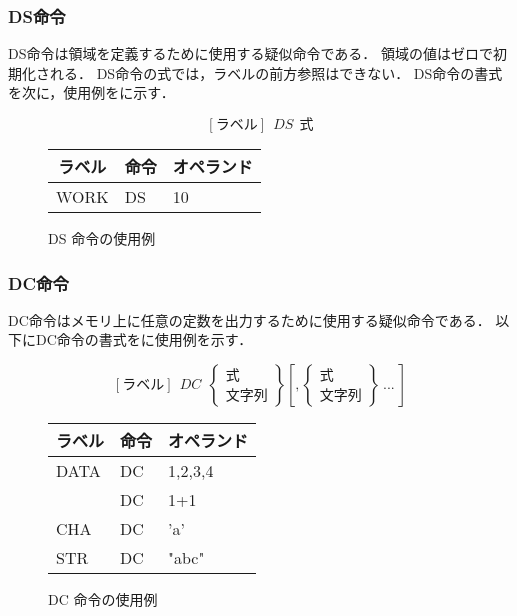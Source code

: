 \subsubsection{DS命令}
DS命令は領域を定義するために使用する疑似命令である．
領域の値はゼロで初期化される．
DS命令の式では，ラベルの前方参照はできない．
DS命令の書式を次に，使用例をに示す．

{\small\[ [ラベル]~~DS~~式 \]}

\begin{figure}[btp]
\begin{center}
{\tt\small\begin{tabular}{|l|l|l|}\hline
\multicolumn{1}{|c|}{ラベル} & 
        \multicolumn{1}{c|}{命令} & \multicolumn{1}{c|}{オペランド} \\\hline
WORK & DS & 10 \\\hline
\end{tabular}}
\caption{DS 命令の使用例}
\label{fig:appB:ds}
\end{center}
\end{figure}

\subsubsection{DC命令}
DC命令はメモリ上に任意の定数を出力するために使用する疑似命令である．
以下にDC命令の書式をに使用例を示す．

{\small\[ %
[ラベル]~~DC~~\left\{
  \begin{array}{c}
   式 \\
   文字列
  \end{array}
 \right\}
[,\left\{
  \begin{array}{c}
   式 \\
   文字列
  \end{array}  
 \right\} ~ ... ~ %
]
\]}

\begin{figure}[btp]
\begin{center}
{\tt\small\begin{tabular}{|l|l|l|}\hline
\multicolumn{1}{|c|}{ラベル} & 
        \multicolumn{1}{c|}{命令} & \multicolumn{1}{c|}{オペランド} \\\hline
DATA & DC & 1,2,3,4 \\
     & DC & 1+1 \\
CHA  & DC & 'a' \\
STR  & DC & "abc" \\\hline
\end{tabular}}
\caption{DC 命令の使用例}
\label{fig:appB:dc}
\end{center}
\end{figure}

